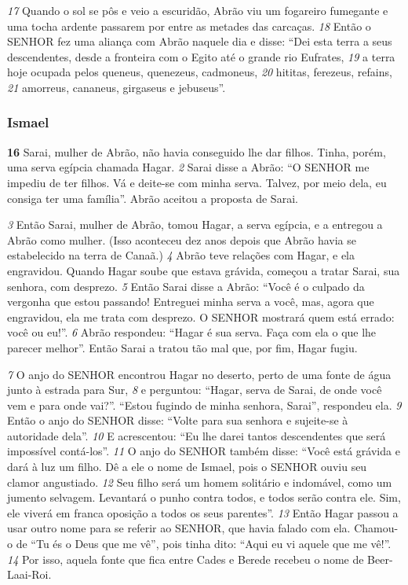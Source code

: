 \bigskip
\textit{\tiny 17}
Quando o sol se pôs e veio a escuridão, Abrão viu um fogareiro fumegante e
uma tocha ardente passarem por entre as metades das carcaças. 
\textit{\tiny 18}
Então o SENHOR
fez uma aliança com Abrão naquele dia e disse: “Dei esta terra a seus
descendentes, desde a fronteira com o Egito até o grande rio Eufrates, 
\textit{\tiny 19}
a terra
hoje ocupada pelos queneus, quenezeus, cadmoneus, 
\textit{\tiny 20}
hititas, ferezeus, refains,
\textit{\tiny 21}
amorreus, cananeus, girgaseus e jebuseus”.

\bigskip
\subsubsection*{Ismael}
\textbf{\large 16}
 Sarai, mulher de Abrão, não havia conseguido lhe dar filhos. Tinha, porém,
uma serva egípcia chamada Hagar. 
\textit{\tiny 2}
Sarai disse a Abrão: “O SENHOR me impediu de
ter filhos. Vá e deite-se com minha serva. Talvez, por meio dela, eu consiga ter
uma família”. Abrão aceitou a proposta de Sarai. 

\bigskip
\textit{\tiny 3}
Então Sarai, mulher de Abrão,
tomou Hagar, a serva egípcia, e a entregou a Abrão como mulher. (Isso aconteceu
dez anos depois que Abrão havia se estabelecido na terra de Canaã.)
\textit{\tiny 4}
Abrão teve relações com Hagar, e ela engravidou. Quando Hagar soube que
estava grávida, começou a tratar Sarai, sua senhora, com desprezo. 
\textit{\tiny 5}
Então Sarai
disse a Abrão: “Você é o culpado da vergonha que estou passando! Entreguei
minha serva a você, mas, agora que engravidou, ela me trata com desprezo. O
SENHOR mostrará quem está errado: você ou eu!”.
\textit{\tiny 6}
Abrão respondeu: “Hagar é sua serva. Faça com ela o que lhe parecer melhor”.
Então Sarai a tratou tão mal que, por fim, Hagar fugiu.

\bigskip
\textit{\tiny 7}
O anjo do SENHOR encontrou Hagar no deserto, perto de uma fonte de água
junto à estrada para Sur, 
\textit{\tiny 8}
e perguntou: “Hagar, serva de Sarai, de onde você vem e
para onde vai?”.
   “Estou fugindo de minha senhora, Sarai”, respondeu ela.
\textit{\tiny 9}
Então o anjo do SENHOR disse: “Volte para sua senhora e sujeite-se à autoridade
dela”. 
\textit{\tiny 10}
E acrescentou: “Eu lhe darei tantos descendentes que será impossível contá-los”.
\textit{\tiny 11}
O anjo do SENHOR também disse: “Você está grávida e dará à luz um filho. Dê
a ele o nome de Ismael, pois o SENHOR ouviu seu clamor angustiado. 
\textit{\tiny 12}
Seu filho
será um homem solitário e indomável, como um jumento selvagem. Levantará o
punho contra todos, e todos serão contra ele. Sim, ele viverá em franca oposição a
todos os seus parentes”.   
\textit{\tiny 13}
Então Hagar passou a usar outro nome para se referir ao SENHOR, que havia
falado com ela. Chamou-o de “Tu és o Deus que me vê”, pois tinha dito: “Aqui eu
vi aquele que me vê!”. 
\textit{\tiny 14}
Por isso, aquela fonte que fica entre Cades e Berede
recebeu o nome de Beer-Laai-Roi.   


